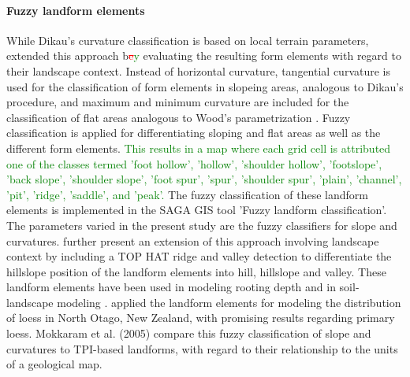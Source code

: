 \documentclass[preprint,12pt,authoryear]{elsarticle}
\begin{document}
\paragraph{Fuzzy landform elements \citep{Schmidt2004}}
While Dikau's curvature classification is based on local terrain parameters, \cite{Schmidt2004} extended this approach b\textcolor{red}{\sout{e}}\textcolor{green}{y} evaluating the resulting form elements with regard to their landscape context.  Instead of horizontal curvature, tangential curvature is used for the classification of form elements in slopeing areas, analogous to Dikau's procedure, and maximum and minimum curvature are included for the classification of flat areas analogous to Wood's parametrization \citep{Wood1996}. Fuzzy classification is applied for differentiating sloping and flat areas as well as the different form elements. \textcolor{green}{This results in a map where each grid cell is attributed one of the classes termed 'foot hollow', 'hollow', 'shoulder hollow', 'footslope', 'back slope', 'shoulder slope', 'foot spur', 'spur', 'shoulder spur', 'plain', 'channel', 'pit', 'ridge', 'saddle', and 'peak'.}
The fuzzy classification of these landform elements is implemented in the SAGA GIS tool 'Fuzzy landform classification'. The parameters varied in the present study are the fuzzy classifiers for slope and curvatures. \cite{Schmidt2004} further present an extension of this approach involving landscape context by including a TOP HAT ridge and valley detection \citep{Rodriguez2002}  to differentiate the hillslope position of the landform elements into hill, hillslope and valley. These landform elements have been used in modeling rooting depth \citep{Schmidt2004} and in  soil-landscape modeling \citep{Schmidt2005}. \cite{Hughes2009} applied  the landform elements for modeling the distribution of loess in North Otago, New Zealand, with promising results regarding primary loess. Mokkaram et al. (2005) compare this fuzzy classification of slope and curvatures to TPI-based landforms, with regard to their relationship to the units of a geological map.
\end{document}
